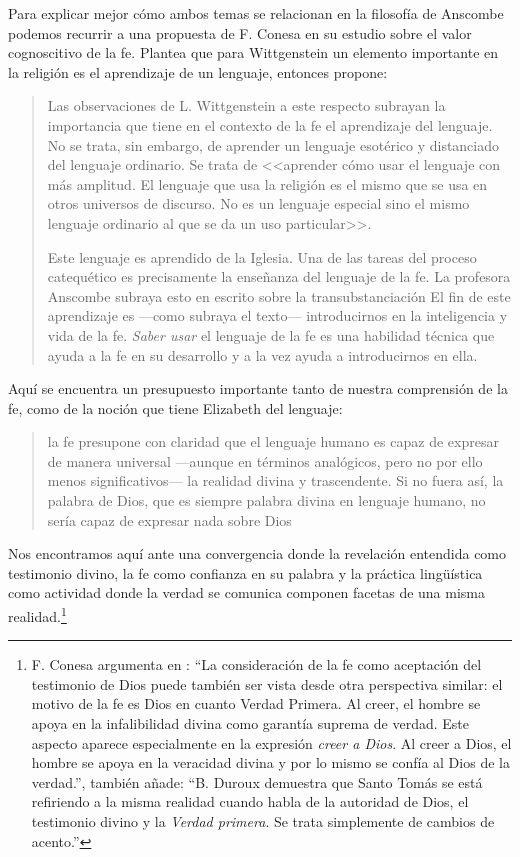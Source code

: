 Para explicar mejor cómo ambos temas se relacionan en la filosofía de Anscombe podemos recurrir a una propuesta de F. Conesa en su estudio sobre el valor cognoscitivo de la fe. Plantea que para Wittgenstein un elemento importante en la religión es el aprendizaje de un lenguaje, entonces propone: \blockquote[{\Cite[310-311]{conesa1994cc}}]{Las observaciones de L. Wittgenstein a este respecto subrayan la importancia que tiene en el contexto de la fe el aprendizaje del lenguaje. No se trata, sin embargo, de aprender un lenguaje esotérico y distanciado del lenguaje ordinario. Se trata de <<aprender cómo usar el lenguaje con más amplitud. El lenguaje que usa la religión es el mismo que se usa en otros universos de discurso. No es un lenguaje especial sino el mismo lenguaje ordinario al que se da un uso particular>>.

Este lenguaje es aprendido de la Iglesia. Una de las tareas del proceso catequético es precisamente la enseñanza del lenguaje de la fe. La profesora Anscombe subraya esto en  escrito sobre la transubstanciación
  \textelp{} El fin de este aprendizaje es ---como subraya el texto--- introducirnos en la inteligencia y vida de la fe. \emph{Saber usar} el lenguaje de la fe es una habilidad técnica que ayuda a la fe en su desarrollo y a la vez ayuda a introducirnos en ella.}

Aquí se encuentra un presupuesto importante tanto de nuestra comprensión de la fe, como de la noción que tiene Elizabeth del lenguaje: \blockquote[][\,(FR 84)]{la fe presupone con claridad que el lenguaje humano es capaz de expresar de manera universal ---aunque en términos analógicos, pero no por ello menos significativos--- la realidad divina y trascendente. Si no fuera así, la palabra de Dios, que es siempre palabra divina en lenguaje humano, no sería capaz de expresar nada sobre Dios}. Nos encontramos aquí ante una convergencia donde la revelación entendida como testimonio divino, la fe como confianza en su palabra y la práctica lingüística como actividad donde la verdad se comunica componen facetas de una misma realidad.\footnote{F. Conesa argumenta en \Cite[259]{conesa1994cc}: \enquote{La consideración de la fe como aceptación del testimonio de Dios puede también ser vista desde otra perspectiva similar: el motivo de la fe es Dios en cuanto Verdad Primera. Al creer, el hombre se apoya en la infalibilidad divina como garantía suprema de verdad. Este aspecto aparece especialmente en la expresión \emph{creer a Dios}. Al creer a Dios, el hombre se apoya en la veracidad divina y por lo mismo se confía al Dios de la verdad.}, también añade: \enquote{B. Duroux demuestra que Santo Tomás se está refiriendo a la misma realidad cuando habla de la autoridad de Dios, el testimonio divino y la \emph{Verdad primera}. Se trata simplemente de cambios de acento.}}

